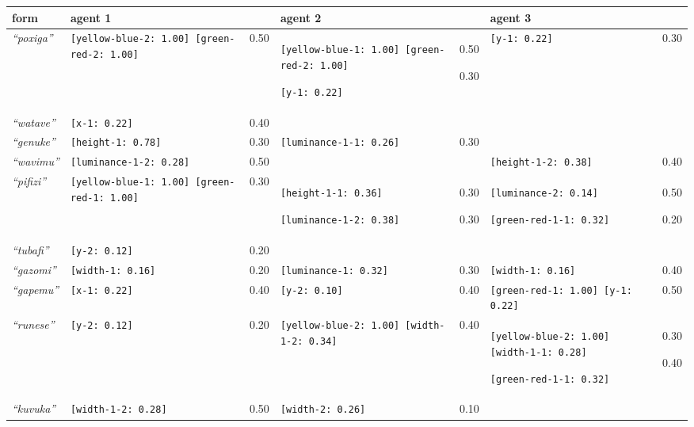 
{\renewcommand{\arraystretch}{1.5}
\begin{tabular}{@{}p{1cm}|p{3cm}@{}p{0.6cm}@{}|p{3.0cm}@{}p{0.6cm}@{}|p{3.0cm}@{}p{0.6cm}@{}}
form & agent 1 &  & agent 2 &  & agent 3 & \\
\hline
\textit{``poxiga''}&\texttt{[yellow-blue-2: 1.00] [green-red-2: 1.00]}
&0.50&\texttt{[yellow-blue-1: 1.00] [green-red-2: 1.00]}


\texttt{[y-1: 0.22]}
&0.50

0.30&\texttt{[y-1: 0.22]}
&0.30\\
\hline
\textit{``watave''}&\texttt{[x-1: 0.22]}
&0.40&&&&\\
\hline
\textit{``genuke''}&\texttt{[height-1: 0.78]}
&0.30&\texttt{[luminance-1-1: 0.26]}
&0.30&&\\
\hline
\textit{``wavimu''}&\texttt{[luminance-1-2: 0.28]}
&0.50&&&\texttt{[height-1-2: 0.38]}
&0.40\\
\hline
\textit{``pifizi''}&\texttt{[yellow-blue-1: 1.00] [green-red-1: 1.00]}
&0.30&\texttt{[height-1-1: 0.36]}


\texttt{[luminance-1-2: 0.38]}
&0.30

0.30&\texttt{[luminance-2: 0.14]}


\texttt{[green-red-1-1: 0.32]}
&0.50

0.20\\
\hline
\textit{``tubafi''}&\texttt{[y-2: 0.12]}
&0.20&&&&\\
\hline
\textit{``gazomi''}&\texttt{[width-1: 0.16]}
&0.20&\texttt{[luminance-1: 0.32]}
&0.30&\texttt{[width-1: 0.16]}
&0.40\\
\hline
\textit{``gapemu''}&\texttt{[x-1: 0.22]}
&0.40&\texttt{[y-2: 0.10]}
&0.40&\texttt{[green-red-1: 1.00] [y-1: 0.22]}
&0.50\\
\hline
\textit{``runese''}&\texttt{[y-2: 0.12]}
&0.20&\texttt{[yellow-blue-2: 1.00] [width-1-2: 0.34]}
&0.40&\texttt{[yellow-blue-2: 1.00] [width-1-1: 0.28]}


\texttt{[green-red-1-1: 0.32]}
&0.30

0.40\\
\hline
\textit{``kuvuka''}&\texttt{[width-1-2: 0.28]}
&0.50&\texttt{[width-2: 0.26]}
&0.10&&
\end{tabular}}


